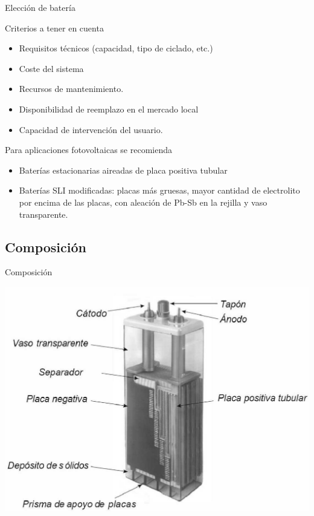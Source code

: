\documentclass[xcolor={usenames,svgnames,dvipsnames}]{beamer}
\begin{document}
\begin{frame}[label={sec:orgdb53029}]{Elección de batería}
\begin{block}{Criterios a tener en cuenta}
\begin{itemize}
\item \alert{Requisitos técnicos} (capacidad, tipo de ciclado, etc.)

\item \alert{Coste del sistema}

\item Recursos de \alert{mantenimiento}.

\item \alert{Disponibilidad de reemplazo} en el mercado local

\item Capacidad de intervención del usuario.
\end{itemize}
\end{block}

\begin{block}{Para aplicaciones fotovoltaicas se recomienda}
\begin{itemize}
\item \alert{Baterías estacionarias aireadas de placa positiva tubular}

\item \alert{Baterías SLI modificadas}: placas más gruesas, mayor cantidad de
electrolito por encima de las placas, con aleación de Pb-Sb en la
rejilla y vaso transparente.
\end{itemize}
\end{block}
\end{frame}


\subsection{Composición}
\label{sec:orge1ac440}

\begin{frame}[label={sec:org28c99c7}]{Composición}
\begin{center}
\includegraphics[width=.9\linewidth]{../figs/AcumuladorBN.pdf}
\end{center}
\end{frame}
\end{document}
